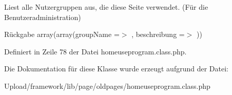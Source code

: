 Liest alle Nutzergruppen aus, die diese Seite verwendet. (Für die Benutzeradministration) \begin{DoxyReturn}{Rückgabe}
array(array(\textquotesingle{}group\+Name\textquotesingle{} =$>$ \textquotesingle{}\textquotesingle{}, \textquotesingle{}beschreibung\textquotesingle{} =$>$ \textquotesingle{}\textquotesingle{})) 
\end{DoxyReturn}


Definiert in Zeile 78 der Datei homeuseprogram.\+class.\+php.



Die Dokumentation für diese Klasse wurde erzeugt aufgrund der Datei\+:\begin{DoxyCompactItemize}
\item 
Upload/framework/lib/page/oldpages/homeuseprogram.\+class.\+php\end{DoxyCompactItemize}
